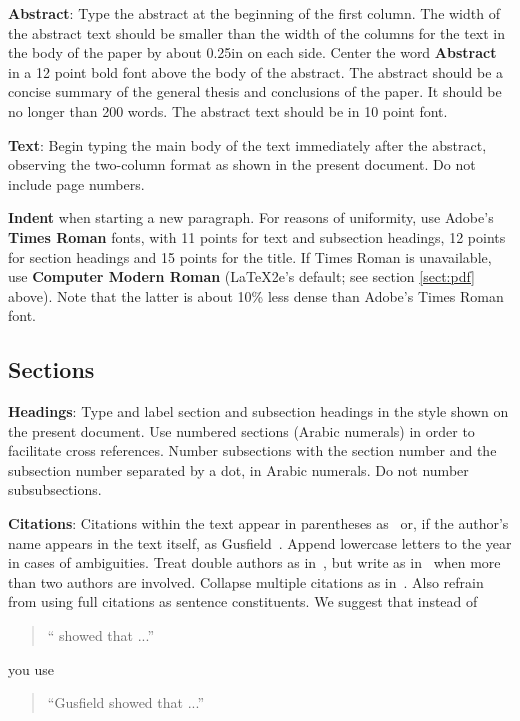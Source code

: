 \documentclass[11pt,letterpaper]{article}
\begin{document}
{\bf Abstract}: Type the abstract at the beginning of the first
column.  The width of the abstract text should be smaller than the
width of the columns for the text in the body of the paper by about
0.25in on each side.  Center the word {\bf Abstract} in a 12 point
bold font above the body of the abstract. The abstract should be a
concise summary of the general thesis and conclusions of the paper.
It should be no longer than 200 words. The abstract text should be in 10 point font.

{\bf Text}: Begin typing the main body of the text immediately after
the abstract, observing the two-column format as shown in
the present document. Do not include page numbers.

{\bf Indent} when starting a new paragraph. For reasons of uniformity,
use Adobe's {\bf Times Roman} fonts, with 11 points for text and
subsection headings, 12 points for section headings and 15 points for
the title.  If Times Roman is unavailable, use {\bf Computer Modern
  Roman} (\LaTeX2e's default; see section \ref{sect:pdf} above).
Note that the latter is about 10\% less dense than Adobe's Times Roman
font.

\subsection{Sections}

{\bf Headings}: Type and label section and subsection headings in the
style shown on the present document.  Use numbered sections (Arabic
numerals) in order to facilitate cross references. Number subsections
with the section number and the subsection number separated by a dot,
in Arabic numerals. Do not number subsubsections.

{\bf Citations}: Citations within the text appear
in parentheses as~\cite{Gusfield:97} or, if the author's name appears in
the text itself, as Gusfield~. Append lowercase letters to the year in cases of ambiguities. Treat double authors as in~\cite{Aho:72}, but write as in~\cite{Chandra:81} when more than two authors are involved. Collapse multiple citations as in~\cite{Gusfield:97,Aho:72}. Also refrain from using full citations as sentence constituents. We suggest that instead of
\begin{quote}
  ``\cite{Gusfield:97} showed that ...''
\end{quote}
you use
\begin{quote}
``Gusfield    showed that ...''
\end{quote}
\end{document}
